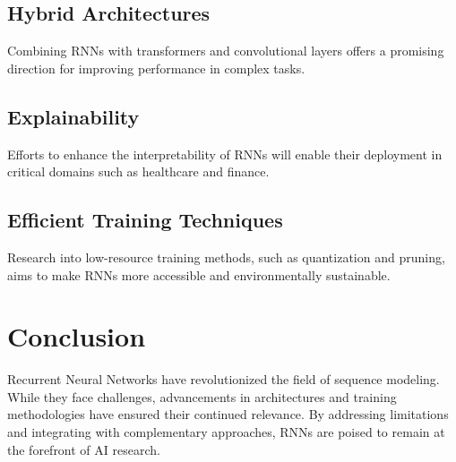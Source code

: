\subsection{Hybrid Architectures}
Combining RNNs with transformers and convolutional layers offers a promising direction for improving performance in complex tasks.

\subsection{Explainability}
Efforts to enhance the interpretability of RNNs will enable their deployment in critical domains such as healthcare and finance.

\subsection{Efficient Training Techniques}
Research into low-resource training methods, such as quantization and pruning, aims to make RNNs more accessible and environmentally sustainable.

\section{Conclusion}
Recurrent Neural Networks have revolutionized the field of sequence modeling. While they face challenges, advancements in architectures and training methodologies have ensured their continued relevance. By addressing limitations and integrating with complementary approaches, RNNs are poised to remain at the forefront of AI research.

